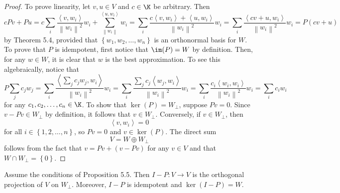 \documentclass[linearalgebraII]{subfiles}
\begin{document}
    \begin{proof}
        To prove linearity, let $v,u\in V$ and $c\in\K$ be arbitrary. Then
        \begin{equation*}
            cPv + Pu = c\sum^{}_{i} \frac{\left\langle v, w_i\right\rangle }{\left\lVert w_i\right\rVert ^2}w_i + \sum^{\left\langle u, w_i\right\rangle }_{\left\lVert w_i\right\rVert } w_i = \sum^{}_{i} \frac{c\left\langle v, w_i\right\rangle + \left\langle u, w_i\right\rangle }{\left\lVert w_i\right\rVert ^2}w_i = \sum^{}_{i} \frac{\left\langle cv+u, w_i\right\rangle }{\left\lVert w_i\right\rVert ^2}w_i = P\left( cv+u \right) 
        \end{equation*}
        by Theorem 5.4, provided that $\left\lbrace w_1,w_2,\ldots,w_n \right\rbrace$ is an orthonormal basis for $W$. To prove that $P$ is idempotent, first notice that $\im(P) = W$ by definition. Then, for any $w\in W$, it is clear that $w$ is the best approximation. To see this algebraically, notice that
        \begin{equation*}
            P\sum^{}_{j} c_jw_j = \sum^{}_{i} \frac{\left\langle \sum^{}_{j} c_jw_j, w_i\right\rangle }{\left\lVert w_i\right\rVert ^2}w_i = \sum^{}_{i} \frac{\sum^{}_{j} c_j\left\langle w_j, w_i\right\rangle }{\left\lVert w_i\right\rVert ^2}w_i = \sum^{}_{i} \frac{c_i\left\langle w_i, w_i\right\rangle }{\left\lVert w_i\right\rVert ^2}w_i = \sum^{}_{i} c_iw_i 
        \end{equation*}
        for any $c_1,c_2,\ldots,c_n\in\K$. To show that $\ker(P) = W_\perp$, suppose $Pv=0$. Since $v-Pv\in W_\perp$ by definition, it follows that $v\in W_\perp$. Conversely, if $v\in W_\perp$, then
        \begin{equation*}
            \left\langle v, w_i\right\rangle = 0
        \end{equation*}
        for all $i\in\left\lbrace 1,2,\ldots,n \right\rbrace$, so $Pv = 0$ and $v\in\ker(P)$. The direct sum
        \begin{equation*}
            V = W\oplus W_\perp
        \end{equation*}
        follows from the fact that $v = Pv + \left( v-Pv \right)$ for any $v\in V$ and that $W\cap W_\perp = \left\lbrace 0 \right\rbrace $.
    \end{proof}

    \begin{cor}{}
        Assume the conditions of Proposition 5.5. Then $I-P:V\to V$ is the orthogonal projection of $V$ on $W_\perp$. Moreover, $I-P$ is idempotent and $\ker(I-P) = W$.
    \end{cor}	
\end{document}
